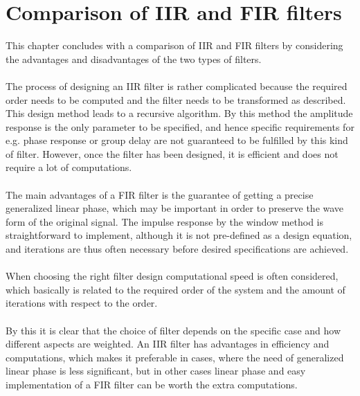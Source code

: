 \section{Comparison of IIR and FIR filters}
This chapter concludes with a comparison of IIR and FIR filters by considering the advantages and disadvantages of the two types of filters.
\\ \\
The process of designing an IIR filter is rather complicated because the required order needs to be computed and the filter needs to be transformed as described. This design method leads to a recursive algorithm. By this method the amplitude response is the only parameter to be specified, and hence specific requirements for e.g. phase response or group delay are not guaranteed to be fulfilled by this kind of filter. However, once the filter has been designed, it is efficient and does not require a lot of computations.
\\ \\
The main advantages of a FIR filter is the guarantee of getting a precise generalized linear phase, which may be important in order to preserve the wave form of the original signal. The impulse response by the window method is straightforward to implement, although it is not pre-defined as a design equation, and iterations are thus often necessary before desired specifications are achieved.
\\ \\
When choosing the right filter design computational speed is often considered, which basically is related to the required order of the system and the amount of iterations with respect to the order.
\\ \\
By this it is clear that the choice of filter depends on the specific case and how different aspects are weighted. An IIR filter has advantages in efficiency and computations, which makes it preferable in cases, where the need of generalized linear phase is less significant, but in other cases linear phase and easy implementation of a FIR filter can be worth the extra computations.
